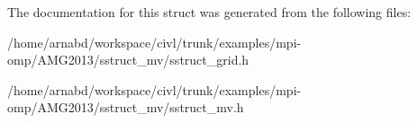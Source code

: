 The documentation for this struct was generated from the following files\+:\begin{DoxyCompactItemize}
\item 
/home/arnabd/workspace/civl/trunk/examples/mpi-\/omp/\+A\+M\+G2013/sstruct\+\_\+mv/sstruct\+\_\+grid.\+h\item 
/home/arnabd/workspace/civl/trunk/examples/mpi-\/omp/\+A\+M\+G2013/sstruct\+\_\+mv/sstruct\+\_\+mv.\+h\end{DoxyCompactItemize}
